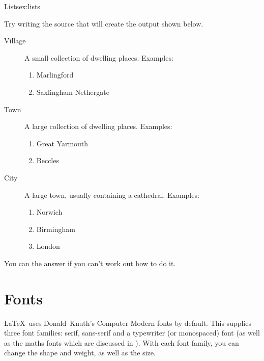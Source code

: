 \begin{exercise}{Lists}{ex:lists}

Try writing the \gls{source} that will create
the output shown below.

\begin{result}
\begin{description}
\item[Village] A small collection of dwelling places.
Examples:
\begin{enumerate}
\item Marlingford
\item Saxlingham Nethergate
\end{enumerate}

\item[Town] A large collection of dwelling places.
Examples:
\begin{enumerate}
\item Great Yarmouth
\item Beccles
\end{enumerate}

\item[City] A large town, usually containing a cathedral.
Examples:
\begin{enumerate}
\item Norwich
\item Birmingham
\item London
\end{enumerate}
\end{description}
\end{result}\bookpagebreak
You can  the answer if you can't work out how to do it.

\end{exercise}


\section{Fonts}
\label{sec:fonts}

\LaTeX\ uses Donald~Knuth's Computer Modern fonts by
default. This
supplies three font families: serif, sans-serif and a typewriter (or
monospaced) font (as well as the maths
fonts which are discussed in
). With each font family, you can
change the shape and weight, as well as the size.

